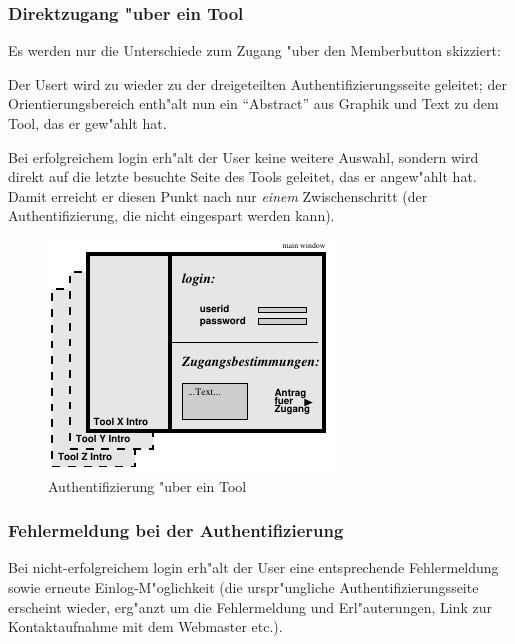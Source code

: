 \clearpage

\subsubsection{Direktzugang "uber ein Tool}\label{kap:toolzugang}

Es werden nur die Unterschiede zum Zugang "uber den Memberbutton skizziert:

Der Usert wird zu wieder zu der dreigeteilten Authentifizierungsseite
geleitet; der Orientierungsbereich enth"alt nun ein ``Abstract'' aus Graphik
und Text zu dem Tool, das er gew"ahlt hat.

Bei erfolgreichem login erh"alt der User keine weitere Auswahl, sondern wird
direkt auf die letzte besuchte Seite des Tools geleitet, das er angew"ahlt
hat.  Damit erreicht er diesen Punkt nach nur \textit{einem} Zwischenschritt
(der Authentifizierung, die nicht eingespart werden kann).

\begin{figure}[h]
\begin{center}
\ifx\pdfoutput\undefined
\else
  \includegraphics{Skizzen/authent_page_tool.pdf}
\fi
\caption{Authentifizierung "uber ein Tool}
\end{center}
\end{figure}


\subsubsection{Fehlermeldung bei der Authentifizierung}

Bei nicht-erfolgreichem login erh"alt der User eine entsprechende
Fehlermeldung sowie erneute Einlog-M"oglichkeit (die urspr"ungliche
Authentifizierungsseite erscheint wieder, erg"anzt um die
Fehlermeldung und Erl"auterungen, Link zur Kontaktaufnahme mit dem
Webmaster etc.).


